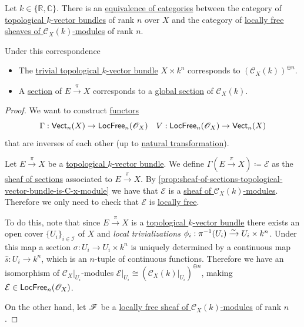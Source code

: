 \documentclass[../../../main]{subfiles}
\begin{document}
\begin{theorem}
  Let \(k \in \{\mathbb{R}, \mathbb{C}\}\).
  There is an \hyperref[def:equivalent-categories]{equivalence of categories} between the category of \hyperref[def:topological-vector-bundle]{topological \(k\)-vector bundles} of rank \(n\) over \(X\) and the category of \hyperref[def:locally-free-sheaf]{locally free sheaves of \(\mathcal{C}_{X}(k)\)-modules} of rank \(n\).

  Under this correspondence
  \begin{itemize}
    \item The \hyperref[ex:trivial-topological-vector-bundle]{trivial topological \(k\)-vector bundle} \(X \times k^{n}\) corresponds to \((\mathcal{C}_{X}(k))^{\oplus n}\).
    \item A \hyperref[def:section-topological-vector-bundle]{section} of \(E \xrightarrow{\pi} X\) corresponds to a \hyperref[def:global-section-sheaf]{global section} of \(\mathcal{C}_{X}(k)\).
  \end{itemize}
\end{theorem}
\begin{proof}
  We want to construct \hyperref[def:functor]{functors}
  \begin{equation*}
    \Gamma: \mathsf{Vect}_{n}(X) \to \mathsf{LocFree}_{n}(\mathscr{O}_{X}) \quad V: \mathsf{LocFree}_{n}(\mathscr{O}_{X}) \to \mathsf{Vect}_{n}(X)
  \end{equation*}
  that are inverses of each other (up to \hyperref[def:natural-transformation]{natural transformation}).

  Let \(E \xrightarrow{\pi} X\) be a \hyperref[def:topological-vector-bundle]{topological \(k\)-vector bundle}.
  We define \(\Gamma(E \xrightarrow{\pi} X) \coloneq \mathcal{E}\) as the \hyperref[def:sheaf-of-sections-topological-vector-bundle]{sheaf of sections} associated to \(E \xrightarrow{\pi} X\).
  By \autoref{prop:sheaf-of-sections-topological-vector-bundle-is-C-x-module} we have that \(\mathcal{E}\) is a \hyperref[def:sheaf-of-modules]{sheaf of \(\mathcal{C}_{X}(k)\)-modules}.
  Therefore we only need to check that \(\mathcal{E}\) is \hyperref[def:locally-free-sheaf]{locally free}.

  To do this, note that since \(E \xrightarrow{\pi} X\) is a \hyperref[def:topological-vector-bundle]{topological \(k\)-vector bundle} there exists an open cover \(\{U_{i}\}_{i \in \mathcal{I}}\) of \(X\) and \textit{local trivializations} \(\phi_{i}: \pi^{-1}(U_{i}) \xrightarrow{\sim} U_{i} \times k^{n}\).
  Under this map a section \(\sigma: U_{i} \to U_{i} \times k^{n}\) is uniquely determined by a continuous map \(\hat{s}: U_{i} \to k^{n}\), which is an \(n\)-tuple of continuous functions.
  Therefore we have an isomorphism of \(\mathcal{C}_{X}|_{U_{i}}\)-modules \(\mathcal{E}|_{U_{i}} \cong \left( \mathcal{C}_{X}(k)|_{U_{i}} \right)^{\oplus n}\), making \(\mathcal{E} \in \mathsf{LocFree}_{n}(\mathscr{O}_{X})\).

  On the other hand, let \(\mathscr{F}\) be a \hyperref[def:locally-free-sheaf]{locally free sheaf of \(\mathcal{C}_{X}(k)\)-modules} of rank \(n\).
\end{proof}
\end{document}

